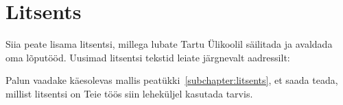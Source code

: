 \section*{Litsents} \label{litsents} 
Siia peate lisama litsentsi, millega lubate Tartu Ülikoolil säilitada ja avaldada oma lõputööd. Uusimad litsentsi tekstid leiate järgnevalt aadressilt:


Palun vaadake käesolevas mallis peatükki~\ref{subchapter:litsents}, et saada teada, millist litsentsi on Teie töös siin leheküljel kasutada tarvis.